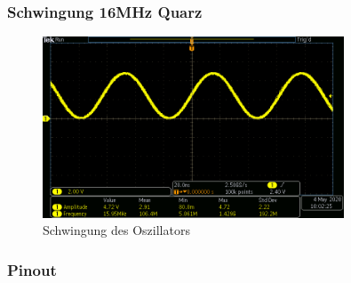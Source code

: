 \subsubsection{Schwingung 16MHz Quarz}

\begin{figure}[H]
\center
\includegraphics[width = 0.8\textwidth]{graphics/Crystal_Swing}
\caption{Schwingung des Oszillators}
\label{fig:Crystal_Swing}
\end{figure}

\subsubsection{Pinout}\label{Appendix:AVR_Pinout}